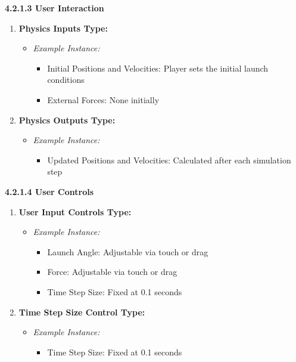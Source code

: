 \documentclass[
]{article}
\begin{document}
\textbf{4.2.1.3 User Interaction}

\begin{enumerate}
\def\labelenumi{\arabic{enumi}.}
\setcounter{enumi}{6}
\item
  \textbf{Physics Inputs Type:}

  \begin{itemize}
  \item
    \emph{Example Instance:}

    \begin{itemize}
    \item
      Initial Positions and Velocities: Player sets the initial launch
      conditions
    \item
      External Forces: None initially
    \end{itemize}
  \end{itemize}
\item
  \textbf{Physics Outputs Type:}

  \begin{itemize}
  \item
    \emph{Example Instance:}

    \begin{itemize}
    \item
      Updated Positions and Velocities: Calculated after each simulation
      step
    \end{itemize}
  \end{itemize}
\end{enumerate}

\textbf{4.2.1.4 User Controls}

\begin{enumerate}
\def\labelenumi{\arabic{enumi}.}
\setcounter{enumi}{8}
\item
  \textbf{User Input Controls Type:}

  \begin{itemize}
  \item
    \emph{Example Instance:}

    \begin{itemize}
    \item
      Launch Angle: Adjustable via touch or drag
    \item
      Force: Adjustable via touch or drag
    \item
      Time Step Size: Fixed at 0.1 seconds
    \end{itemize}
  \end{itemize}
\item
  \textbf{Time Step Size Control Type:}

  \begin{itemize}
  \item
    \emph{Example Instance:}

    \begin{itemize}
    \item
      Time Step Size: Fixed at 0.1 seconds
    \end{itemize}
  \end{itemize}
\end{enumerate}
\end{document}
